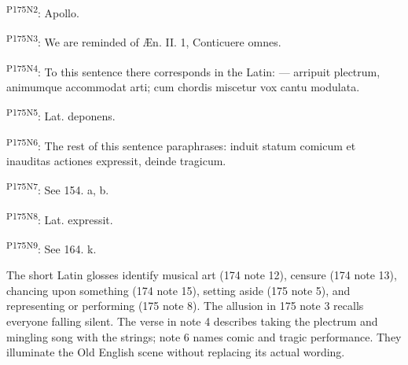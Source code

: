 \textsuperscript{P175N2}: Apollo.

\textsuperscript{P175N3}: We are reminded of Æn. II. 1, Conticuere omnes.

\textsuperscript{P175N4}: To this sentence there corresponds in the Latin: — arripuit plectrum, animumque accommodat arti; cum chordis miscetur vox cantu modulata.

\textsuperscript{P175N5}: Lat. deponens.

\textsuperscript{P175N6}: The rest of this sentence paraphrases: induit statum comicum et inauditas actiones expressit, deinde tragicum.

\textsuperscript{P175N7}: See 154. a, b.

\textsuperscript{P175N8}: Lat. expressit.

\textsuperscript{P175N9}: See 164. k.

The short Latin glosses identify musical art (174 note 12), censure (174 note 13), chancing upon something (174 note 15), setting aside (175 note 5), and representing or performing (175 note 8). The allusion in 175 note 3 recalls everyone falling silent. The verse in note 4 describes taking the plectrum and mingling song with the strings; note 6 names comic and tragic performance. They illuminate the Old English scene without replacing its actual wording.

\endgroup

\par\label{end-ch17-learner}
\clearpage\endgroup

